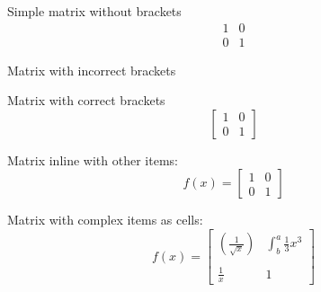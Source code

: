 \documentclass{article}
\begin{document}
Simple matrix without brackets
\begin{equation*}
\begin{matrix}
1 & 0\\
0 & 1
\end{matrix}
\end{equation*}

Matrix with incorrect brackets
\begin{equation*}
[
\begin{matrix}
1 & 0\\
0 & 1
\end{matrix}
]
\end{equation*}

Matrix with correct brackets
\begin{equation*}
\left[
\begin{matrix}
1 & 0\\
0 & 1
\end{matrix}
\right]
\end{equation*}

Matrix inline with other items:
\begin{equation*}
f(x) =
\left[
\begin{matrix}
1 & 0\\
0 & 1
\end{matrix}
\right]
\end{equation*}

Matrix with complex items as cells:
\begin{equation*}
f(x) =
\left[
\begin{matrix}
\left(\frac{1}{\sqrt{x}}\right) & \int^a_b \frac{1}{3}x^3\\\\
\frac{1}{x} & 1
\end{matrix}
\right]
\end{equation*}
\end{document}
